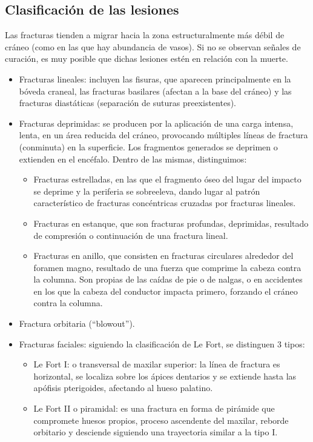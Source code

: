 \subsection{Clasificación de las lesiones}
Las fracturas tienden a migrar hacia la zona estructuralmente más débil de cráneo (como en las que hay abundancia de vasos). Si no se observan señales de curación, es muy posible que dichas lesiones estén en relación con la muerte.\
\begin{itemize}
	\item Fracturas lineales: incluyen las fisuras, que aparecen principalmente en la bóveda craneal, las fracturas basilares (afectan a la base del cráneo) y las fracturas diastáticas (separación de suturas preexistentes). 
	\item Fracturas deprimidas: se producen por la aplicación de una carga intensa, lenta, en un área reducida del cráneo, provocando múltiples líneas de fractura (conminuta) en la superficie. Los fragmentos generados se deprimen o extienden en el encéfalo.  Dentro de las mismas, distinguimos: 
	\begin{itemize}
		\item Fracturas estrelladas, en las que el fragmento óseo del lugar del impacto se deprime y la periferia se sobreeleva, dando lugar al patrón característico de fracturas concéntricas cruzadas por fracturas lineales.
		\item Fracturas en estanque, que son fracturas profundas, deprimidas, resultado de compresión o continuación de una fractura lineal.
		\item Fracturas en anillo, que consisten en fracturas circulares alrededor del foramen magno, resultado de una fuerza que comprime la cabeza contra la columna. Son propias de las caídas de pie o de nalgas, o en accidentes en los que la cabeza del conductor impacta primero, forzando el cráneo contra la columna. 
		\end{itemize}
	\item Fractura orbitaria (“blowout”).
	\item Fracturas faciales: siguiendo la clasificación de Le Fort, se distinguen 3 tipos:
	\begin{itemize}
		\item Le Fort I: o transversal de maxilar superior: la línea de fractura es horizontal, se localiza sobre los ápices dentarios y se extiende hasta las apófisis pterigoides, afectando al hueso palatino. 
		\item Le Fort II o piramidal: es una fractura en forma de pirámide que compromete huesos propios, proceso ascendente del maxilar, reborde orbitario y desciende siguiendo una trayectoria similar a la tipo I. 

\end{itemize}
\end{itemize}
